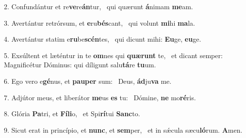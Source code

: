 2. Confundántur et re\textbf{ve}re\textbf{án}tur, \ast\  qui quærunt \textbf{á}nimam \textbf{me}am.\

3. Avertántur retrórsum, et \textbf{e}ru\textbf{bés}cant, \ast\  qui volunt \textbf{mi}hi \textbf{ma}la.\

4. Avertántur statim e\textbf{ru}be\textbf{scén}tes, \ast\  qui dicunt mihi: \textbf{Eu}ge, \textbf{eu}ge.\

5. Exsúltent et læténtur in te \textbf{om}nes qui \textbf{quæ}\textbf{runt} te, \ast\  et dicant semper: Magnificétur Dóminus: qui díligunt salu\textbf{tá}re \textbf{tu}um.\

6. Ego vero e\textbf{gé}nus, et \textbf{pau}\textbf{per} sum: \ast\  Deus, \textbf{ád}ju\textbf{va} me.\

7. Adjútor meus, et liberátor \textbf{me}us \textbf{es} tu: \ast\  Dómine, \textbf{ne} mo\textbf{ré}ris.\

8. Glória \textbf{Pa}tri, et \textbf{Fí}\textbf{li}o, \ast\  et Spi\textbf{rí}tui \textbf{Sanc}to.\

9. Sicut erat in princípio, et \textbf{nunc}, et \textbf{sem}per, \ast\  et in sǽcula sæcu\textbf{ló}rum. \textbf{A}men.\

